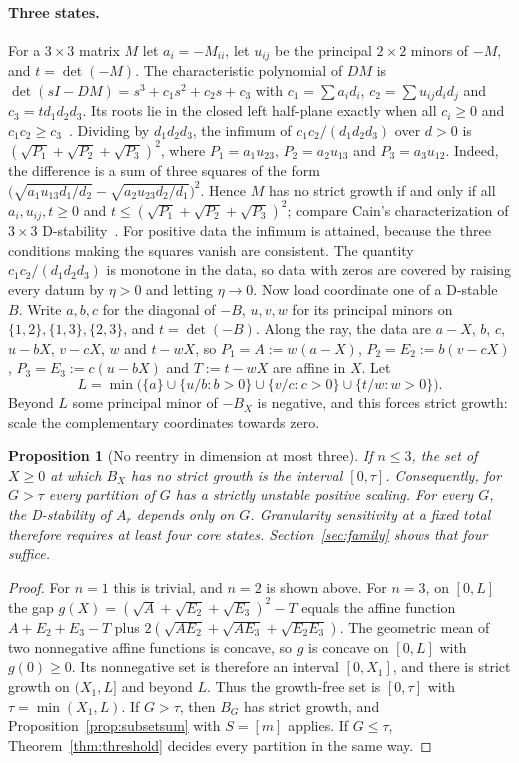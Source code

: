 \documentclass[11pt,a4paper]{article}
\theoremstyle{plain}
\newtheorem{proposition}[theorem]{Proposition}
\theoremstyle{definition}
\theoremstyle{remark}
\begin{document}
\paragraph{Three states.}
For a $3\times3$ matrix $M$ let $a_i=-M_{ii}$, let $u_{ij}$ be the principal
$2\times2$ minors of $-M$, and $t=\det(-M)$. The characteristic polynomial of
$DM$ is $\det(sI-DM)=s^3+c_1s^2+c_2s+c_3$ with $c_1=\sum a_id_i$,
$c_2=\sum u_{ij}d_id_j$ and $c_3=td_1d_2d_3$. Its roots lie in the closed left
half-plane exactly when all $c_i\ge0$ and $c_1c_2\ge c_3$~\cite{gantmacher1959}.
Dividing by $d_1d_2d_3$, the infimum of $c_1c_2/(d_1d_2d_3)$ over $d>0$ is
$(\sqrt{P_1}+\sqrt{P_2}+\sqrt{P_3})^2$, where
$P_1=a_1u_{23}$, $P_2=a_2u_{13}$ and $P_3=a_3u_{12}$. Indeed, the difference is a sum
of three squares of the form
$\bigl(\sqrt{a_1u_{13}d_1/d_2}-\sqrt{a_2u_{23}d_2/d_1}\bigr)^2$. Hence $M$
has no strict growth if and only if all $a_i,u_{ij},t\ge0$ and
$t\le(\sqrt{P_1}+\sqrt{P_2}+\sqrt{P_3})^2$; compare Cain's characterization of
$3\times3$ D-stability~\cite{cain1976}. For positive data the infimum is
attained, because the three conditions making the squares vanish are
consistent. The quantity $c_1c_2/(d_1d_2d_3)$ is monotone in the data, so
data with zeros are covered by raising every datum by $\eta>0$ and letting
$\eta\to0$. Now load
coordinate one of a D-stable $B$. Write $a,b,c$ for the diagonal of $-B$, $u,v,w$
for its principal minors on $\{1,2\},\{1,3\},\{2,3\}$, and $t=\det(-B)$.
Along the ray, the data are $a-X$, $b$, $c$, $u-bX$, $v-cX$, $w$ and $t-wX$,
so $P_1=A:=w(a-X)$, $P_2=E_2:=b(v-cX)$, $P_3=E_3:=c(u-bX)$ and $T:=t-wX$ are
affine in $X$. Let
\[
 L=\min\bigl(\{a\}\cup\{u/b:b>0\}\cup\{v/c:c>0\}\cup\{t/w:w>0\}\bigr).
\]
Beyond $L$ some principal minor of $-B_X$ is negative, and this forces strict
growth: scale the complementary coordinates towards zero.

\begin{proposition}[No reentry in dimension at most three]\label{prop:small}
If $n\le3$, the set of $X\ge0$ at which $B_X$ has no strict growth is the
interval $[0,\tau]$. Consequently, for $G>\tau$ every partition of $G$ has a
strictly unstable positive scaling. For every $G$, the D-stability of $A_r$
depends only on $G$. Granularity sensitivity at a fixed total therefore
requires at least four core states. Section~\ref{sec:family} shows that four
suffice.
\end{proposition}
\begin{proof}
For $n=1$ this is trivial, and $n=2$ is shown above. For $n=3$, on $[0,L]$ the
gap $g(X)=(\sqrt A+\sqrt{E_2}+\sqrt{E_3})^2-T$ equals the affine function
$A+E_2+E_3-T$ plus $2(\sqrt{AE_2}+\sqrt{AE_3}+\sqrt{E_2E_3})$. The geometric
mean of two nonnegative affine functions is concave, so $g$ is concave on
$[0,L]$ with $g(0)\ge0$. Its nonnegative set is therefore an interval
$[0,X_1]$, and there is strict growth on $(X_1,L]$ and beyond $L$. Thus the
growth-free set is $[0,\tau]$ with $\tau=\min(X_1,L)$. If $G>\tau$, then $B_G$
has strict growth, and Proposition~\ref{prop:subsetsum} with $S=[m]$ applies.
If $G\le\tau$, Theorem~\ref{thm:threshold} decides every partition in the same
way.
\end{proof}
\end{document}
